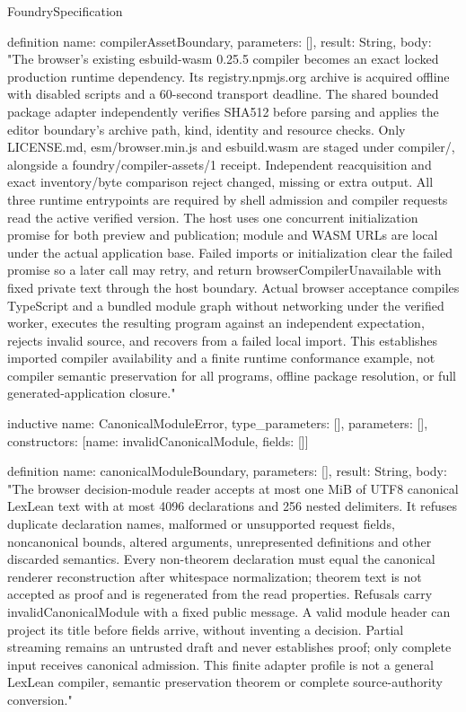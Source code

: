 \begin{lexlean}{FoundrySpecification}
\begin{semanticmodule}
definition{
  name: compilerAssetBoundary,
  parameters: [],
  result: String,
  body: "The browser's existing esbuild-wasm 0.25.5 compiler becomes an exact locked production runtime dependency. Its registry.npmjs.org archive is acquired offline with disabled scripts and a 60-second transport deadline. The shared bounded package adapter independently verifies SHA512 before parsing and applies the editor boundary's archive path, kind, identity and resource checks. Only LICENSE.md, esm/browser.min.js and esbuild.wasm are staged under compiler/, alongside a foundry/compiler-assets/1 receipt. Independent reacquisition and exact inventory/byte comparison reject changed, missing or extra output. All three runtime entrypoints are required by shell admission and compiler requests read the active verified version. The host uses one concurrent initialization promise for both preview and publication; module and WASM URLs are local under the actual application base. Failed imports or initialization clear the failed promise so a later call may retry, and return browserCompilerUnavailable with fixed private text through the host boundary. Actual browser acceptance compiles TypeScript and a bundled module graph without networking under the verified worker, executes the resulting program against an independent expectation, rejects invalid source, and recovers from a failed local import. This establishes imported compiler availability and a finite runtime conformance example, not compiler semantic preservation for all programs, offline package resolution, or full generated-application closure."
}

inductive{
  name: CanonicalModuleError,
  type_parameters: [],
  parameters: [],
  constructors: [{name: invalidCanonicalModule, fields: []}]
}

definition{
  name: canonicalModuleBoundary,
  parameters: [],
  result: String,
  body: "The browser decision-module reader accepts at most one MiB of UTF8 canonical LexLean text with at most 4096 declarations and 256 nested delimiters. It refuses duplicate declaration names, malformed or unsupported request fields, noncanonical bounds, altered arguments, unrepresented definitions and other discarded semantics. Every non-theorem declaration must equal the canonical renderer reconstruction after whitespace normalization; theorem text is not accepted as proof and is regenerated from the read properties. Refusals carry invalidCanonicalModule with a fixed public message. A valid module header can project its title before fields arrive, without inventing a decision. Partial streaming remains an untrusted draft and never establishes proof; only complete input receives canonical admission. This finite adapter profile is not a general LexLean compiler, semantic preservation theorem or complete source-authority conversion."
}


\end{semanticmodule}
\end{lexlean}
